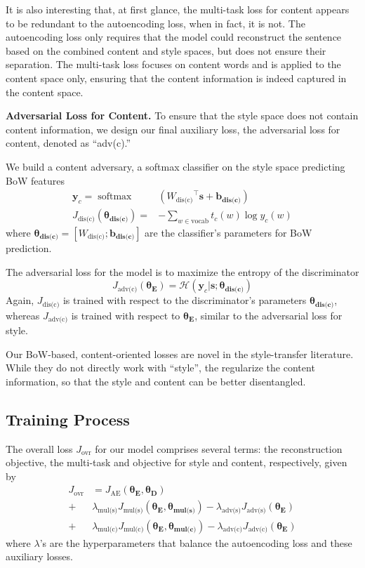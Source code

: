 \documentclass[11pt,a4paper]{article}
\newcommand{\loss}[1]{J_{\text{#1}}}
\newcommand{\hyp}[1]{\lambda_{\text{#1}}}
\newcommand{\nnweight}[1]{\bm{\theta_{\text{#1}}}}
\newcommand{\weight}[1]{W_{\text{#1}}}
\newcommand{\bias}[1]{\bm{b_{\text{#1}}}}
\begin{document}
It is also interesting that, at first glance, the multi-task loss for content appears to be redundant to the autoencoding loss, when in fact, it is not.  The autoencoding loss only requires that the model could reconstruct the sentence based on the combined content and style spaces, but does not ensure their separation. The multi-task loss focuses on content words and is applied to the content space only, ensuring that the content information is indeed captured in the content space.

\textbf{Adversarial Loss for Content.} To ensure that the style space does not contain content information, we design our final auxiliary loss, the adversarial loss for content, denoted as ``adv(c).''

We build a content adversary, a softmax classifier on the style space predicting BoW features
\begin{align}
	\label{eqn:adv-bow-disc-loss}
	\bm y_c   = \operatorname{softmax} & ({\weight{dis(c)}}^\top \bm s + \bias{dis(c)})     \\
	\loss{dis(c)}(\nnweight{dis(c)}) = & - \sum\limits_{w\in\text{vocab}} t_c(w)\log y_c(w)
\end{align}
where $\nnweight{dis(c)}=[\weight{dis(c)}; \bias{dis(c)}]$ are the classifier's parameters for BoW prediction.

The adversarial loss for the model is to maximize the entropy of the discriminator
\begin{equation}
	\loss{adv(c)}(\nnweight{E}) = \mathcal{H}(\bm y_c | \bm s; \nnweight{dis(c)})
\end{equation}
Again, $\loss{dis(c)}$ is trained with respect to the discriminator's parameters $\nnweight{dis(c)}$, whereas $\loss{adv(c)}$ is trained with respect to $\nnweight{E}$, similar to the adversarial loss for style.

Our BoW-based, content-oriented losses are novel in the style-transfer literature. 
While they do not directly work with ``style'', the regularize the content information, so that the style and content can be better disentangled. 


\subsection{Training Process}

The overall loss $\loss{ovr}$ for our model comprises several terms: the reconstruction objective, the multi-task and objective for style and content, respectively, given by
\begin{align}
	\loss{ovr} & =  \loss{AE}(\nnweight{E}, \nnweight{D})                                                                         \\
	+          & \hyp{mul(s)} \loss{mul(s)} (\nnweight{E},\nnweight{mul(s)}) - \hyp{adv(s)} \loss{adv(s)}(\nnweight{E}) \nonumber \\
	+          & \hyp{mul(c)} \loss{mul(c)} (\nnweight{E},\nnweight{mul(c)}) - \hyp{adv(c)} \loss{adv(c)}(\nnweight{E}) \nonumber
\end{align}
where $\lambda$'s are the hyperparameters that balance the autoencoding loss and these auxiliary losses.
\end{document}
